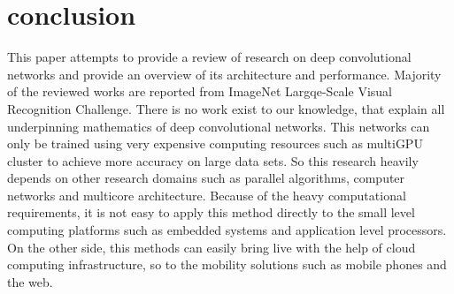 \documentclass{article}
\begin{document}
\section{conclusion}
This paper attempts to provide a  review of research on deep convolutional networks  and provide an overview of  its architecture and performance. Majority of the reviewed  works are reported from ImageNet Largqe-Scale Visual Recognition Challenge. There is no work exist to our knowledge, that explain all underpinning mathematics  of  deep convolutional  networks. This networks can only be trained using very expensive computing resources such as multiGPU cluster  to achieve more accuracy on large data sets. So  this research heavily depends on other research domains such as parallel algorithms, computer networks and multicore architecture. Because of the heavy computational requirements, it is not easy to apply this method directly  to the small level computing platforms such as embedded systems and application level  processors. On the other side, this methods can easily bring  live with the help of  cloud computing infrastructure, so to the mobility solutions such as mobile phones and the web.



\end{document}
